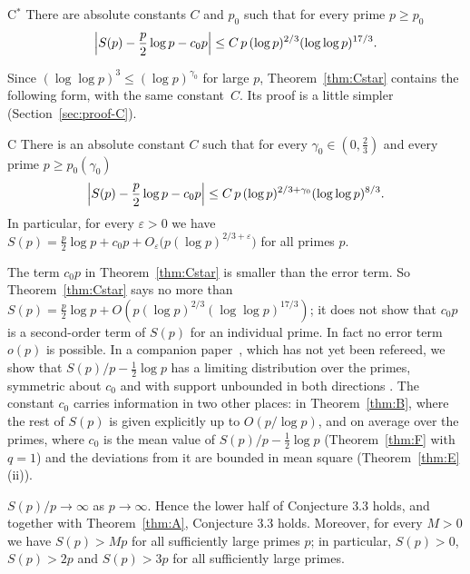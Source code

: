 \begin{namedthm}{C$^*$}\label{thm:Cstar}
There are absolute constants $C$ and $p_0$ such that for every prime $p\ge p_0$
\[
\Bigl|S(p)-\frac p2\log p-c_0p\Bigr|\le C\,p\,(\log p)^{2/3}(\log\log p)^{17/3}.
\]
\end{namedthm}

Since $(\log\log p)^3\le(\log p)^{\gamma_0}$ for large $p$, Theorem~\ref{thm:Cstar} contains the following form, with the same constant~$C$. Its proof is a little simpler (Section~\ref{sec:proof-C}).

\begin{namedthm}{C}\label{thm:C}
There is an absolute constant $C$ such that for every $\gamma_0\in(0,\frac23)$ and every prime $p\ge p_0(\gamma_0)$
\[
\Bigl|S(p)-\frac p2\log p-c_0p\Bigr|\le C\,p\,(\log p)^{2/3+\gamma_0}(\log\log p)^{8/3}.
\]
In particular, for every $\varepsilon>0$ we have $S(p)=\frac p2\log p+c_0p+O_\varepsilon\bigl(p(\log p)^{2/3+\varepsilon}\bigr)$ for all primes $p$.
\end{namedthm}

The term $c_0p$ in Theorem~\ref{thm:Cstar} is smaller than the error term. So Theorem~\ref{thm:Cstar} says no more than $S(p)=\frac p2\log p+O(p(\log p)^{2/3}(\log\log p)^{17/3})$; it does not show that $c_0p$ is a second-order term of $S(p)$ for an individual prime. In fact no error term $o(p)$ is possible. In a companion paper~\cite{b32}, which has not yet been refereed, we show that $S(p)/p-\frac12\log p$ has a limiting distribution over the primes, symmetric about $c_0$ and with support unbounded in both directions \cite[Theorem~1, Corollary~3.3 and Remark~3.4]{b32}. The constant $c_0$ carries information in two other places: in Theorem~\ref{thm:B}, where the rest of $S(p)$ is given explicitly up to $O(p/\log p)$, and on average over the primes, where $c_0$ is the mean value of $S(p)/p-\frac12\log p$ (Theorem~\ref{thm:F} with $q=1$) and the deviations from it are bounded in mean square (Theorem~\ref{thm:E}(ii)).

\begin{corollary}\label{cor:conj33}
$S(p)/p\to\infty$ as $p\to\infty$. Hence the lower half of Conjecture \textup{3.3} holds, and together with Theorem~\ref{thm:A}, Conjecture \textup{3.3} holds. Moreover, for every $M>0$ we have $S(p)>Mp$ for all sufficiently large primes $p$; in particular, $S(p)>0$, $S(p)>2p$ and $S(p)>3p$ for all sufficiently large primes.
\end{corollary}

